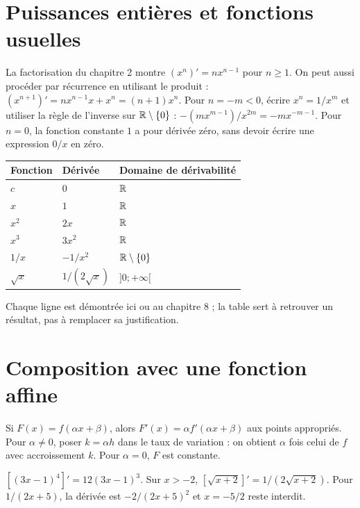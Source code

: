 \documentclass[../cours_1re.tex]{subfiles}
\begin{document}
\section{Puissances entières et fonctions usuelles}
La factorisation du chapitre 2 montre $(x^n)'=nx^{n-1}$ pour $n\ge1$.
On peut aussi procéder par récurrence en utilisant le produit :
$(x^{n+1})'=nx^{n-1}x+x^n=(n+1)x^n$.
Pour $n=-m<0$, écrire $x^n=1/x^m$ et utiliser la règle de l'inverse sur $\mathbb{R}\setminus\{0\}$ :
$-(mx^{m-1})/x^{2m}=-mx^{-m-1}$.
Pour $n=0$, la fonction constante $1$ a pour dérivée zéro, sans devoir écrire une expression $0/x$ en zéro.
\begin{center}\begin{tabular}{lll}\toprule
Fonction & Dérivée & Domaine de dérivabilité\\\midrule
$c$ & $0$ & $\mathbb{R}$\\
$x$ & $1$ & $\mathbb{R}$\\
$x^2$ & $2x$ & $\mathbb{R}$\\
$x^3$ & $3x^2$ & $\mathbb{R}$\\
$1/x$ & $-1/x^2$ & $\mathbb{R}\setminus\{0\}$\\
$\sqrt x$ & $1/(2\sqrt x)$ & $]0;+\infty[$\\\bottomrule
\end{tabular}\end{center}
Chaque ligne est démontrée ici ou au chapitre 8 ; la table sert à retrouver un résultat, pas à remplacer sa justification.
\section{Composition avec une fonction affine}
Si $F(x)=f(\alpha x+\beta)$, alors $F'(x)=\alpha f'(\alpha x+\beta)$ aux points appropriés.
Pour $\alpha\ne0$, poser $k=\alpha h$ dans le taux de variation : on obtient $\alpha$ fois celui de $f$ avec accroissement $k$. Pour $\alpha=0$, $F$ est constante.
\begin{exemple}
$[(3x-1)^4]'=12(3x-1)^3$.
Sur $x>-2$, $[\sqrt{x+2}]'=1/(2\sqrt{x+2})$.
Pour $1/(2x+5)$, la dérivée est $-2/(2x+5)^2$ et $x=-5/2$ reste interdit.
\end{exemple}
\end{document}
